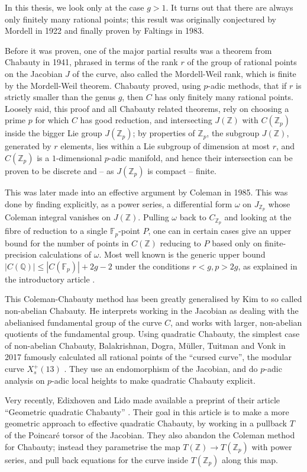 \documentclass[12pt]{article}
\newcommand{\Z}{\mathbb{Z}}
\newcommand{\Q}{\mathbb{Q}}
\newcommand{\F}{\mathbb{F}}
\theoremstyle{plain}
\theoremstyle{definition}
\theoremstyle{remark}
\begin{document}
In this thesis, we look only at the case $g > 1$. It turns out that there are always only finitely many rational points; this result was originally conjectured by Mordell in 1922 and finally proven by Faltings in 1983.

Before it was proven, one of the major partial results was a theorem from Chabauty in 1941, phrased in terms of the rank $r$ of the group of rational points on the Jacobian $J$ of the curve, also called the Mordell-Weil rank, which is finite by the Mordell-Weil theorem. Chabauty proved, using $p$-adic methods, that if $r$ is strictly smaller than the genus $g$, then $C$ has only finitely many rational points. Loosely said, this proof and all Chabauty related theorems, rely on choosing a prime $p$ for which $C$ has good reduction, and intersecting $J(\Z)$ with $C(\Z_p)$ inside the bigger Lie group $J(\Z_p)$; by properties of $\Z_p$, the subgroup $J(\Z)$, generated by $r$ elements, lies within a Lie subgroup of dimension at most $r$, and $C(\Z_p)$ is a $1$-dimensional $p$-adic manifold, and hence their intersection can be proven to be discrete and -- as $J(\Z_p)$ is compact -- finite.

This was later made into an effective argument by Coleman in 1985. This was done by finding explicitly, as a power series, a differential form $\omega$ on $J_{\Z_p}$ whose Coleman integral vanishes on $J(\Z)$. Pulling $\omega$ back to $C_{\Z_p}$ and looking at the fibre of reduction to a single $\F_p$-point $P$, one can in certain cases give an upper bound for the number of points in $C(\Z)$ reducing to $P$ based only on finite-precision calculations of $\omega$. Most well known is the generic upper bound $|C(\Q)| \leq |C(\F_p)| + 2g-2$ under the conditions $r < g, p > 2g$, as explained in the introductory article \cite{poonen12}.

This Coleman-Chabauty method has been greatly generalised by Kim to so called non-abelian Chabauty. He interprets working in the Jacobian as dealing with the abelianised fundamental group of the curve $C$, and works with larger, non-abelian quotients of the fundamental group. Using quadratic Chabauty, the simplest case of non-abelian Chabauty, Balakrishnan, Dogra, M\"uller, Tuitman and Vonk in 2017 famously calculated  all rational points of the ``cursed curve'', the modular curve $X_s^+(13)$ \cite{cursedcurve}. They use an endomorphism of the Jacobian, and do $p$-adic analysis on $p$-adic local heights to make quadratic Chabauty explicit. 

Very recently, Edixhoven and Lido made available a preprint of their article ``Geometric quadratic Chabauty'' \cite{edixhoven20}. Their goal in this article is to make a more geometric approach to effective quadratic Chabauty, by working in a pullback $T$ of the Poincar\'e torsor of the Jacobian. They also abandon the Coleman method for Chabauty; instead they parametrise the map $T(\Z) \to T(\Z_p)$ with power series, and pull back equations for the curve inside $T(\Z_p)$ along this map. 
\end{document}
